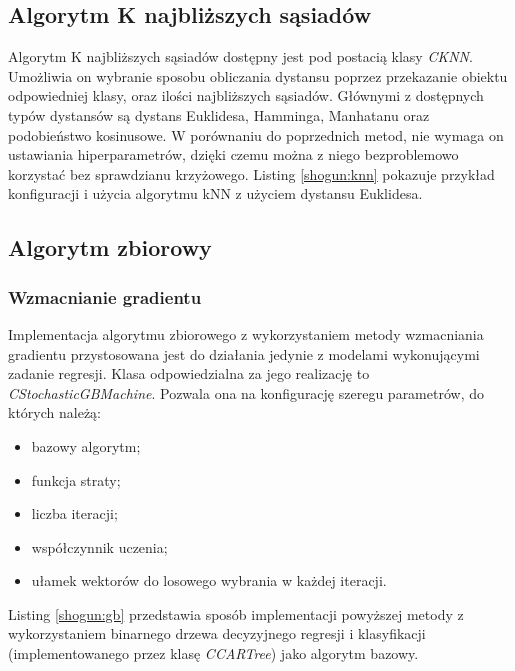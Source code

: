 
\subsection{Algorytm K najbliższych sąsiadów}

Algorytm K najbliższych sąsiadów dostępny jest pod postacią klasy \textit{CKNN}. Umożliwia on wybranie sposobu obliczania dystansu poprzez przekazanie obiektu odpowiedniej klasy, oraz ilości najbliższych sąsiadów. Głównymi z dostępnych typów dystansów są dystans Euklidesa, Hamminga, Manhatanu oraz podobieństwo kosinusowe. W porównaniu do poprzednich metod, nie wymaga on ustawiania hiperparametrów, dzięki czemu można z niego bezproblemowo korzystać bez sprawdzianu krzyżowego. Listing \ref{shogun:knn} pokazuje przykład konfiguracji i użycia algorytmu kNN z użyciem dystansu Euklidesa.


\subsection{Algorytm zbiorowy}
\subsubsection{Wzmacnianie gradientu}
Implementacja algorytmu zbiorowego z wykorzystaniem metody wzmacniania gradientu przystosowana jest do działania jedynie z modelami wykonującymi zadanie regresji. Klasa odpowiedzialna za jego realizację to \textit{CStochasticGBMachine}. Pozwala ona na konfigurację szeregu parametrów, do których należą:

\begin{itemize}
	\item bazowy algorytm;
	\item funkcja straty;
	\item liczba iteracji;
	\item współczynnik uczenia;
	\item ułamek wektorów do losowego wybrania w każdej iteracji.
\end{itemize}

Listing \ref{shogun:gb} przedstawia sposób implementacji powyższej metody z wykorzystaniem binarnego drzewa decyzyjnego regresji i klasyfikacji (implementowanego przez klasę \textit{CCARTree}) jako algorytm bazowy. 

